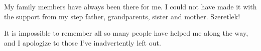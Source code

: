 My family members have always been there for me. I could not have made it with the support from my step father, grandparents, sister and mother. Szeretlek!



It is impossible to remember all so many people have helped me along the way, and I apologize to those I've inadvertently left out.





\begin{comment}

I owe my gratitude to all the people who have made this thesis possible and because of whom my graduate experience has been one that I will cherish forever.

First and foremost I'd like to thank my advisor, Professor Rajarshi Roy for giving me an invaluable opportunity to work on challenging and extremely interesting projects over the past four years. He has always made himself available for help and advice and there has never been an occasion when I've knocked on his door and he hasn't given me time. It has been a pleasure to work with and learn from such an extraordinary individual.

I would also like to thank my co-advisor, Dr. Parvez Guzdar. Without his extraordinary theoretical ideas and computational expertise, this thesis would have been a distant dream. Thanks are due to Professor Robert Gammon, Professor Edward Ott and Professor Thomas Antonsen for agreeing to serve on my thesis committee and for sparing their invaluable time reviewing the manuscript.

My colleagues at the nonlinear optics laboratory have enriched my graduate life in many ways and deserve a special mention. David DeShazer helped me start-off by rewriting the basic simulation code in a user-friendly format. Christian Silva provided help by setting up the GRENOUILLE apparatus and performing some of the simulations. My interaction with  Rohit Tripathi, Ryan McAllister, Vasily Dronov, Min-Young Kim, Elizabeth Rogers, William Ray, Jordi Garcia Ojalvo, Riccardo Meucci, Atsushi Uchida, and Fabian Rogister has been very fruitful. I'd also like to thank Wing-Shun Lam and Benjamin Zeff for providing the LaTex style files for writing this thesis.

I would also like to acknowledge help and support from some of the staff members. Donald Martin's technical help is highly appreciated, as is the computer hardware support from Edward Condon, LaTex and software help from Dorothea Brosius and purchasing help from Nancy Boone.


\end{comment}
